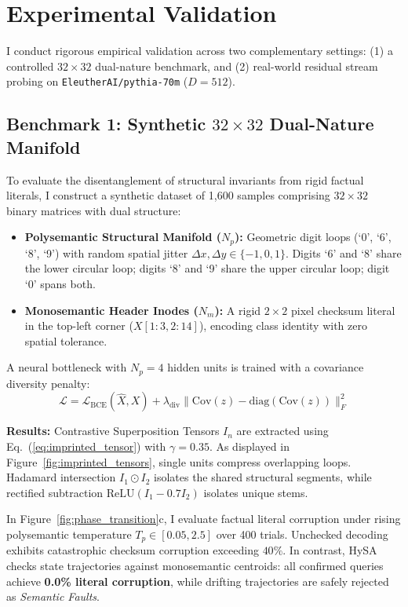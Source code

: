 \documentclass[10pt,twocolumn]{article}
\theoremstyle{definition}
\begin{document}
\section{Experimental Validation}

I conduct rigorous empirical validation across two complementary settings: (1) a controlled $32 \times 32$ dual-nature benchmark, and (2) real-world residual stream probing on \texttt{EleutherAI/pythia-70m} ($D=512$).

\subsection{Benchmark 1: Synthetic \texorpdfstring{$32 \times 32$}{32x32} Dual-Nature Manifold}
To evaluate the disentanglement of structural invariants from rigid factual literals, I construct a synthetic dataset of 1,600 samples comprising $32 \times 32$ binary matrices with dual structure:
\begin{itemize}[leftmargin=*, itemsep=1.5pt]
    \item \textbf{Polysemantic Structural Manifold ($N_p$):} Geometric digit loops (`0', `6', `8', `9') with random spatial jitter $\Delta x, \Delta y \in \{-1, 0, 1\}$. Digits `6' and `8' share the lower circular loop; digits `8' and `9' share the upper circular loop; digit `0' spans both.
    \item \textbf{Monosemantic Header Inodes ($N_m$):} A rigid $2 \times 2$ pixel checksum literal in the top-left corner ($X[1:3, 2:14]$), encoding class identity with zero spatial tolerance.
\end{itemize}

A neural bottleneck with $N_p=4$ hidden units is trained with a covariance diversity penalty:
\begin{equation}
    \mathcal{L} = \mathcal{L}_{\mathrm{BCE}}(\hat{X}, X) + \lambda_{\mathrm{div}} \|\mathrm{Cov}(z) - \mathrm{diag}(\mathrm{Cov}(z))\|_F^2
\end{equation}

\textbf{Results:} Contrastive Superposition Tensors $I_n$ are extracted using Eq.~(\ref{eq:imprinted_tensor}) with $\gamma = 0.35$. As displayed in Figure~\ref{fig:imprinted_tensors}, single units compress overlapping loops. Hadamard intersection $I_1 \odot I_2$ isolates the shared structural segments, while rectified subtraction $\mathrm{ReLU}(I_1 - 0.7 I_2)$ isolates unique stems. 

In Figure~\ref{fig:phase_transition}c, I evaluate factual literal corruption under rising polysemantic temperature $T_p \in [0.05, 2.5]$ over 400 trials. Unchecked decoding exhibits catastrophic checksum corruption exceeding $40\%$. In contrast, HySA checks state trajectories against monosemantic centroids: all confirmed queries achieve \textbf{0.0\% literal corruption}, while drifting trajectories are safely rejected as \textit{Semantic Faults}.
\end{document}
